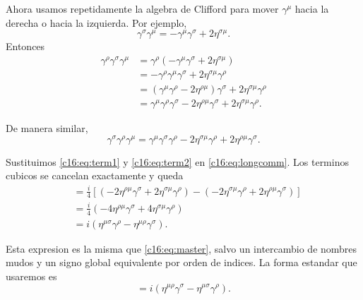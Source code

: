 Ahora usamos repetidamente la algebra de Clifford para mover $\gamma^\mu$ hacia la derecha o hacia la izquierda. Por ejemplo,
\begin{equation}
\gamma^\sigma\gamma^\mu
=
-\gamma^\mu\gamma^\sigma + 2\eta^{\sigma\mu}.
\end{equation}
Entonces
\begin{align}
\gamma^\rho\gamma^\sigma\gamma^\mu
&=
\gamma^\rho(-\gamma^\mu\gamma^\sigma+2\eta^{\sigma\mu})
\\
&=
-\gamma^\rho\gamma^\mu\gamma^\sigma + 2\eta^{\sigma\mu}\gamma^\rho
\\
&=
(\gamma^\mu\gamma^\rho-2\eta^{\rho\mu})\gamma^\sigma + 2\eta^{\sigma\mu}\gamma^\rho
\\
&=
\gamma^\mu\gamma^\rho\gamma^\sigma
-2\eta^{\rho\mu}\gamma^\sigma
+2\eta^{\sigma\mu}\gamma^\rho.
\label{c16:eq:term1}
\end{align}

De manera similar,
\begin{equation}
\gamma^\sigma\gamma^\rho\gamma^\mu
=
\gamma^\mu\gamma^\sigma\gamma^\rho
-2\eta^{\sigma\mu}\gamma^\rho
+2\eta^{\rho\mu}\gamma^\sigma.
\label{c16:eq:term2}
\end{equation}

Sustituimos \eqref{c16:eq:term1} y \eqref{c16:eq:term2} en \eqref{c16:eq:longcomm}. Los terminos cubicos se cancelan exactamente y queda
\begin{align}
[\Sigma^{\rho\sigma},\gamma^\mu]
&=
\frac{i}{4}
\left[
(-2\eta^{\rho\mu}\gamma^\sigma+2\eta^{\sigma\mu}\gamma^\rho)
-(-2\eta^{\sigma\mu}\gamma^\rho+2\eta^{\rho\mu}\gamma^\sigma)
\right]
\\
&=
\frac{i}{4}
\left(
-4\eta^{\rho\mu}\gamma^\sigma
+4\eta^{\sigma\mu}\gamma^\rho
\right)
\\
&=
i(\eta^{\mu\sigma}\gamma^\rho-\eta^{\mu\rho}\gamma^\sigma).
\end{align}

Esta expresion es la misma que \eqref{c16:eq:master}, salvo un intercambio de nombres mudos y un signo global equivalente por orden de indices. La forma estandar que usaremos es
\begin{equation}
[\Sigma^{\rho\sigma},\gamma^\mu]
=
i(\eta^{\mu\rho}\gamma^\sigma-\eta^{\mu\sigma}\gamma^\rho).
\end{equation}

